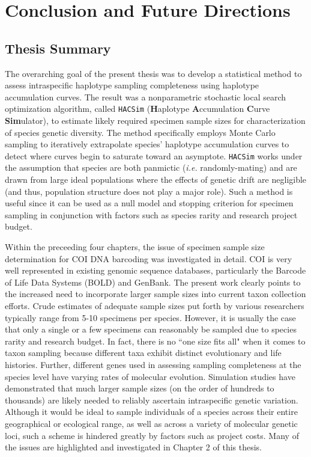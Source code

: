 \linespread{1.0}

\chapter{Conclusion and Future Directions}
\section{Thesis Summary} \label{sec:intro1}

The overarching goal of the present thesis was to develop a statistical method to assess intraspecific haplotype sampling completeness using haplotype accumulation curves. The result was a nonparametric stochastic local search optimization algorithm, called {\tt HACSim} (\textbf{H}aplotype \textbf{A}ccumulation \textbf{C}urve \textbf{Sim}ulator), to estimate likely required specimen sample sizes for characterization of species genetic diversity. The method specifically employs Monte Carlo sampling to iteratively extrapolate species' haplotype accumulation curves to detect where curves begin to saturate toward an asymptote. {\tt HACSim} works under the assumption that species are both panmictic (\textit{i.e.} randomly-mating) and are drawn from large ideal populations where the effects of genetic drift are negligible (and thus, population structure does not play a major role). Such a method is useful since it can be used as a null model and stopping criterion for specimen sampling in conjunction with factors such as species rarity and research project budget.

Within the preceeding four chapters, the issue of specimen sample size determination for COI DNA barcoding was investigated in detail. COI is very well represented in existing genomic sequence databases, particularly the Barcode of Life Data Systems (BOLD) and GenBank. The present work clearly points to the increased need to incorporate larger sample sizes into current taxon collection efforts. Crude estimates of adequate sample sizes put forth by various researchers typically range from 5-10 specimens per species. However, it is usually the case that only a single or a few specimens can reasonably be sampled due to species rarity and research budget. In fact, there is no ``one size fits all" when it comes to taxon sampling because different taxa exhibit distinct evolutionary and life histories. Further, different genes used in assessing sampling completeness at the species level have varying rates of molecular evolution. Simulation studies have demonstrated that much larger sample sizes (on the order of hundreds to thousands) are likely needed to reliably ascertain intraspecific genetic variation. Although it would be ideal to sample individuals of a species across their entire geographical or ecological range, as well as across a variety of molecular genetic loci, such a scheme is hindered greatly by factors such as project costs. Many of the issues are highlighted and investigated in Chapter 2 of this thesis.

